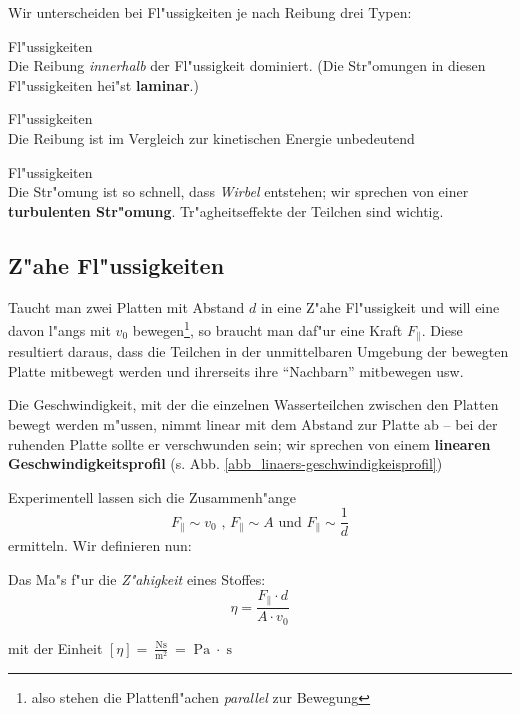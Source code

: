 \bigskip
Wir unterscheiden bei Fl"ussigkeiten je nach Reibung drei Typen:
\begin{description}[\setlabelstyle{\bfseries\slshape}]
\item[Z"ahe] Fl"ussigkeiten\\Die Reibung \emph{innerhalb} der
   Fl"ussigkeit dominiert. (Die Str"omungen in diesen Fl"ussigkeiten
   hei"st \textbf{laminar}.)
\item[Ideale] Fl"ussigkeiten\\Die Reibung ist im Vergleich zur
   kinetischen Energie unbedeutend
\item[Reale] Fl"ussigkeiten\\Die Str"omung ist so schnell, dass
   \emph{Wirbel} entstehen; wir sprechen von einer
   \textbf{turbulenten
     Str"omung}. Tr"agheitseffekte der Teilchen sind wichtig.
\end{description}




\subsection{Z"ahe Fl"ussigkeiten}
\label{kap_zahe-flussigkeiten}

Taucht man zwei Platten mit Abstand $d$ in eine Z"ahe Fl"ussigkeit und
will eine davon l"angs mit $v_0$ bewegen\footnote{also stehen die
  Plattenfl"achen \emph{parallel} zur Bewegung}, so braucht man daf"ur
eine Kraft $F_\|$. Diese resultiert daraus, dass die Teilchen in der
unmittelbaren Umgebung der bewegten Platte mitbewegt werden und
ihrerseits ihre "`Nachbarn"' mitbewegen usw.

Die Geschwindigkeit, mit der die einzelnen Wasserteilchen zwischen den
Platten bewegt werden m"ussen, nimmt linear mit dem Abstand zur Platte
ab -- bei der ruhenden Platte sollte er verschwunden sein; wir
sprechen von einem \textbf{linearen
  Geschwindigkeitsprofil}
(s. Abb. \ref{abb_linaers-geschwindigkeisprofil})

Experimentell lassen sich die Zusammenh"ange
$$
F_\| \sim v_0 \text{ , } F_\| \sim A \text{ und } F_\| \sim \frac{1}{d}
$$
ermitteln. Wir definieren nun:
\begin{Def}
Das Ma"s f"ur die \emph{Z"ahigkeit} eines Stoffes:
   \begin{equation}
      \label{eqn_def_viskositaet}
      \eta = \frac{F_\| \cdot d}{A \cdot v_0}
   \end{equation}
\end{Def}
mit der Einheit $[\eta] = \frac{\operatorname{Ns}}{\operatorname{m^2}}
= \operatorname{Pa}\cdot \operatorname{s}$

